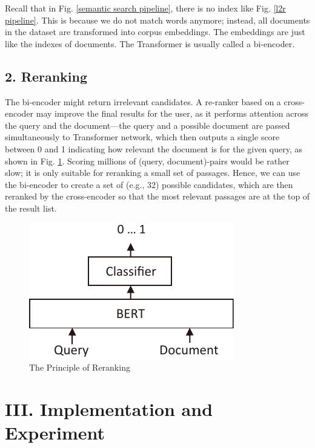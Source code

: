\documentclass[11pt]{article}
\begin{document}
Recall that in Fig. \ref{semantic search pipeline}, there is no index like Fig. \ref{l2r pipeline}. This is because we
do not match words anymore; instead, all documents in the dataset are
transformed into corpus embeddings. The embeddings are just like the
indexes of documents. The Transformer is usually called a bi-encoder.

\hypertarget{2-reranking}{%
\subsection{2. Reranking}\label{2-reranking}}

The bi-encoder might return irrelevant candidates. A re-ranker based on
a cross-encoder may improve the final results for the user, as it
performs attention across the query and the document---the query and a
possible document are passed simultaneously to Transformer network,
which then outputs a single score between 0 and 1 indicating how
relevant the document is for the given query, as shown in Fig. \ref{reranking principle}.
Scoring millions of (query, document)-pairs would be rather slow; it is
only suitable for reranking a small set of passages. Hence, we can use
the bi-encoder to create a set of (e.g., 32) possible candidates, which
are then reranked by the cross-encoder so that the most relevant
passages are at the top of the result list.

\begin{figure}
\centering
\includegraphics{readme.assets/cross-encoder.pdf}
\caption{The Principle of Reranking}
\label{reranking principle}
\end{figure}

\hypertarget{iii-implementation-and-experiment}{%
\section{III. Implementation and
Experiment}\label{iii-implementation-and-experiment}}
\end{document}
